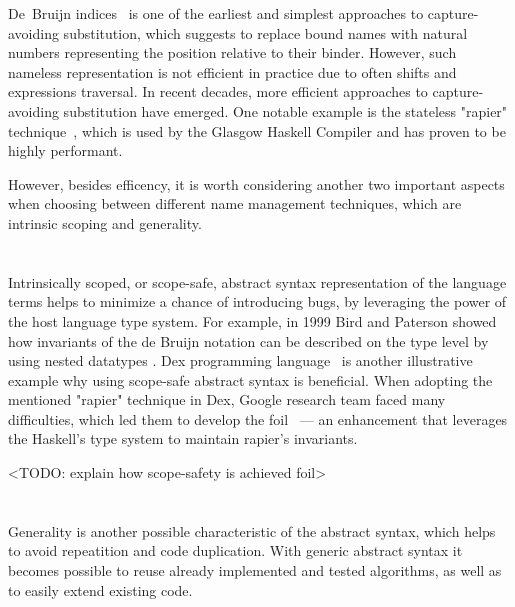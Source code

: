 De~Bruijn indices~\cite{deBruijn1972} is one of the earliest and simplest approaches to capture-avoiding substitution, which suggests to replace bound names with natural numbers representing the position relative to their binder. However, such nameless representation is not efficient in practice due to often shifts and expressions traversal. In recent decades, more efficient approaches to capture-avoiding substitution have emerged. One notable example is the stateless "rapier" technique~\cite{Simon2002_SecretsGHC}, which is used by the Glasgow Haskell Compiler and has proven to be highly performant. %

However, besides efficency, it is worth considering another two important aspects when choosing between different name management techniques, which are intrinsic scoping and generality.

\section{}

Intrinsically scoped, or scope-safe, abstract syntax representation of the language terms helps to minimize a chance of introducing bugs, by leveraging the power of the host language type system. For example, in 1999 Bird and Paterson \cite{BirdPaterson1999_BruijnNested} showed how invariants of the de Bruijn notation can be described on the type level by using nested datatypes \cite{Bird1998_NestedDatatypes}. Dex programming language~\cite{PaszkeDex_2021} is another illustrative example why using scope-safe abstract syntax is beneficial. When adopting the mentioned "rapier" technique in Dex, Google research team faced many difficulties, which led them to develop the foil~\cite{Foil} — an enhancement that leverages the Haskell's type system to maintain rapier's invariants.

<TODO: explain how scope-safety is achieved foil>

\section{}

Generality is another possible characteristic of the abstract syntax, which helps to avoid repeatition and code duplication. With generic abstract syntax it becomes possible to reuse already implemented and tested algorithms, as well as to easily extend existing code. 

